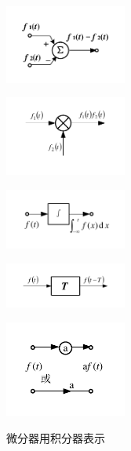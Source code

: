 \begin{Figure}[连续系统的基本单元]
    \begin{FigureSub}[加法器]
        \includegraphics[width=40mm]{visio/1.16-a.pdf}
    \end{FigureSub}
    \begin{FigureSub}[乘法器]
        \includegraphics[width=40mm]{visio/1.16-b.pdf}
    \end{FigureSub}
    \begin{FigureSub}[积分器]
        \includegraphics[width=40mm]{visio/1.16-c.pdf}
    \end{FigureSub}
    \begin{FigureSub}[延时器]
        \includegraphics[width=40mm]{visio/1.16-d.pdf}
    \end{FigureSub}
    \begin{FigureSub}[数乘器]
        \includegraphics[width=40mm]{visio/1.16-e.pdf}
    \end{FigureSub}
\end{Figure}

微分器用积分器表示

